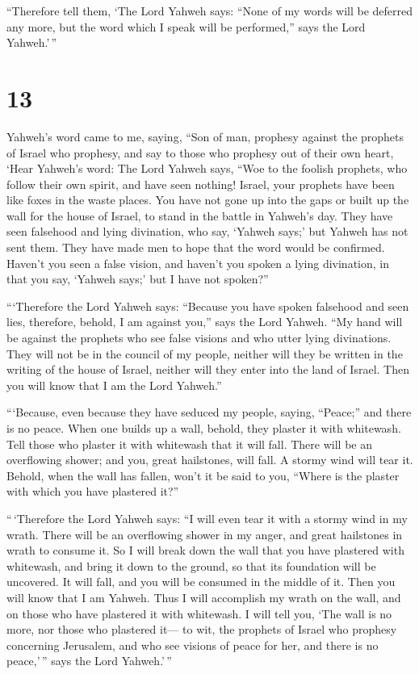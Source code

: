  ``Therefore tell them, `The Lord Yahweh says: ``None of my
words will be deferred any more, but the word which I speak will be
performed,'' says the Lord Yahweh.'\,''

\hypertarget{section-11}{%
\section{13}\label{section-11}}

 Yahweh's word came to me, saying,  ``Son of
man, prophesy against the prophets of Israel who prophesy, and say to
those who prophesy out of their own heart, `Hear Yahweh's word:
 The Lord Yahweh says, ``Woe to the foolish prophets, who
follow their own spirit, and have seen nothing!  Israel,
your prophets have been like foxes in the waste places.  You
have not gone up into the gaps or built up the wall for the house of
Israel, to stand in the battle in Yahweh's day.  They have
seen falsehood and lying divination, who say, `Yahweh says;' but Yahweh
has not sent them. They have made men to hope that the word would be
confirmed.  Haven't you seen a false vision, and haven't you
spoken a lying divination, in that you say, `Yahweh says;' but I have
not spoken?''

 ```Therefore the Lord Yahweh says: ``Because you have
spoken falsehood and seen lies, therefore, behold, I am against you,''
says the Lord Yahweh.  ``My hand will be against the
prophets who see false visions and who utter lying divinations. They
will not be in the council of my people, neither will they be written in
the writing of the house of Israel, neither will they enter into the
land of Israel. Then you will know that I am the Lord Yahweh.''

 ```Because, even because they have seduced my people,
saying, ``Peace;'' and there is no peace. When one builds up a wall,
behold, they plaster it with whitewash.  Tell those who
plaster it with whitewash that it will fall. There will be an
overflowing shower; and you, great hailstones, will fall. A stormy wind
will tear it.  Behold, when the wall has fallen, won't it
be said to you, ``Where is the plaster with which you have plastered
it?''

 ``\,`Therefore the Lord Yahweh says: ``I will even tear it
with a stormy wind in my wrath. There will be an overflowing shower in
my anger, and great hailstones in wrath to consume it.  So
I will break down the wall that you have plastered with whitewash, and
bring it down to the ground, so that its foundation will be uncovered.
It will fall, and you will be consumed in the middle of it. Then you
will know that I am Yahweh.  Thus I will accomplish my
wrath on the wall, and on those who have plastered it with whitewash. I
will tell you, `The wall is no more, nor those who plastered it---
 to wit, the prophets of Israel who prophesy concerning
Jerusalem, and who see visions of peace for her, and there is no
peace,'\,'' says the Lord Yahweh.'\,''

